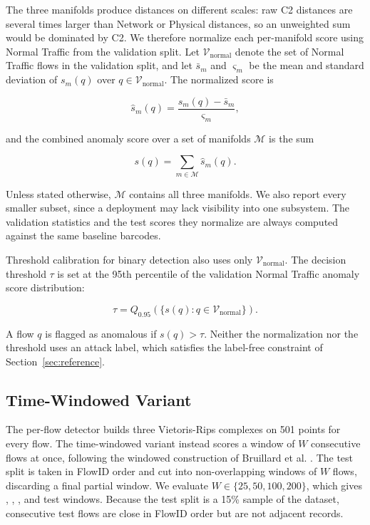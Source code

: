 \documentclass[conf]{new-aiaa}
\begin{document}
The three manifolds produce distances on different scales: raw C2 distances are several times larger than Network or Physical distances, so an unweighted sum would be dominated by C2. We therefore normalize each per-manifold score using Normal Traffic from the validation split. Let $\mathcal{V}_{\text{normal}}$ denote the set of Normal Traffic flows in the validation split, and let $\bar{s}_m$ and $\varsigma_m$ be the mean and standard deviation of $s_m(q)$ over $q \in \mathcal{V}_{\text{normal}}$. The normalized score is

\begin{equation}
\hat{s}_m(q) = \frac{s_m(q) - \bar{s}_m}{\varsigma_m},
\label{eq:znorm}
\end{equation}

and the combined anomaly score over a set of manifolds $\mathcal{M}$ is the sum

\begin{equation}
s(q) = \sum_{m \in \mathcal{M}} \hat{s}_m(q).
\label{eq:combined_score}
\end{equation}

Unless stated otherwise, $\mathcal{M}$ contains all three manifolds. We also report every smaller subset, since a deployment may lack visibility into one subsystem. The validation statistics and the test scores they normalize are always computed against the same baseline barcodes.

Threshold calibration for binary detection also uses only $\mathcal{V}_{\text{normal}}$. The decision threshold $\tau$ is set at the 95th percentile of the validation Normal Traffic anomaly score distribution:

\begin{equation}
\tau = Q_{0.95}\!\left( \{ s(q) : q \in \mathcal{V}_{\text{normal}} \} \right).
\label{eq:threshold}
\end{equation}

A flow $q$ is flagged as anomalous if $s(q) > \tau$. Neither the normalization nor the threshold uses an attack label, which satisfies the label-free constraint of Section~\ref{sec:reference}.

\subsection{Time-Windowed Variant}
\label{sec:windowed}

The per-flow detector builds three Vietoris-Rips complexes on 501 points for every flow. The time-windowed variant instead scores a window of $W$ consecutive flows at once, following the windowed construction of Bruillard et al. \cite{Bruillard}. The test split is taken in FlowID order and cut into non-overlapping windows of $W$ flows, discarding a final partial window. We evaluate $W \in \{25, 50, 100, 200\}$, which gives \NWinTwentyFive{}, \NWinFifty{}, \NWinHundred{}, and \NWinTwoHundred{} test windows. Because the test split is a 15\% sample of the dataset, consecutive test flows are close in FlowID order but are not adjacent records.
\end{document}
